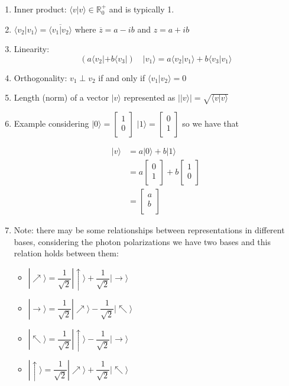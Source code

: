 \documentclass[12pt,a4paper]{report}
\begin{document}
\begin{enumerate}
\item Inner product: $ \langle v | v \rangle \in \mathbb{R}^{+}_{0} $ and is typically 1.
\item $ \langle v_2 | v_1 \rangle = \overline{\langle v_1 | v_2 \rangle}$ where $\overline{z} = a-ib$ and $z = a+ib$
\item Linearity:
$$ ( a  \langle v_2 | + b \langle v_3 | ) \quad | v_1 \rangle =
a  \langle v_2 | v_1 \rangle + b \langle v_3 | v_1 \rangle $$
\item Orthogonality: $ v_1 \perp v_2 $ if and only if $ \langle v_1 | v_2 \rangle = 0 $
\item Length (norm) of a vector $ | v \rangle $ represented as
$ | | v \rangle | = \sqrt{ \langle v | v \rangle }$
\item Example considering
$|0\rangle =
\begin{bmatrix}
1 \\
0 \\
\end{bmatrix}$
$ |1\rangle =
\begin{bmatrix}
0 \\
1 \\
\end{bmatrix}
$
so we have that

\begin{align*}
    |v\rangle &= a|0\rangle + b|1\rangle \\
    &= a \begin{bmatrix}
0 \\
1 \\
\end{bmatrix}
+
b
\begin{bmatrix}
1 \\
0 \\
\end{bmatrix} \\
&= \begin{bmatrix}
a \\
b \\
\end{bmatrix}
\end{align*}
\item Note: there may be some relationships between representations in different bases, considering the photon polarizations we have two bases and this relation holds between them:
\begin{itemize}
\item $ |\nearrow\rangle = \dfrac{1}{\sqrt{2}} |\uparrow\rangle + \dfrac{1}{\sqrt{2}} |\rightarrow\rangle $
\item $ |\rightarrow\rangle = \dfrac{1}{\sqrt{2}} |\nearrow\rangle - \dfrac{1}{\sqrt{2}} |\nwarrow\rangle $
\item $ |\nwarrow\rangle = \dfrac{1}{\sqrt{2}} |\uparrow\rangle - \dfrac{1}{\sqrt{2}} |\rightarrow\rangle $
\item $ |\uparrow\rangle = \dfrac{1}{\sqrt{2}} |\nearrow\rangle + \dfrac{1}{\sqrt{2}} |\nwarrow\rangle $
\end{itemize}
\end{enumerate}
\end{document}
